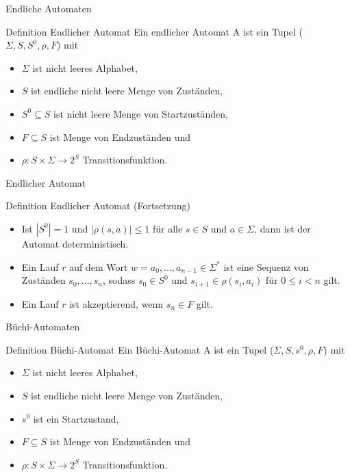 \begin{frame}{Endliche Automaten}
\begin{block}{Definition Endlicher Automat}
Ein endlicher Automat A ist ein Tupel ($\Sigma, S, S^0, \rho, F$) mit
\begin{itemize}
\setlength\itemsep{1em}
\item $\Sigma$ ist nicht leeres Alphabet,
\item $S$ ist endliche nicht leere Menge von Zuständen,
\item $S^0\subseteq S$ ist nicht leere Menge von Startzuständen,
\item $F\subseteq S$ ist Menge von Endzuständen und
\item $\rho : S \times \Sigma \rightarrow 2^S$ Transitionsfunktion.
\end{itemize}
\end{block}
\end{frame}

\begin{frame}{Endlicher Automat}
\begin{block}{Definition Endlicher Automat (Fortsetzung)}
\begin{itemize}
\item Ist $|S^0|=1$ und $|\rho(s,a)|\leq 1$ für alle $s\in S$ und $a\in \Sigma$, dann ist der Automat deterministisch.
\item Ein Lauf $r$ auf dem Wort $w=a_0,...,a_{n-1}\in \Sigma^\ast$ ist eine Sequenz von Zuständen $s_0,...,s_n$, sodass $s_0\in S^0$ und $s_{i+1}\in \rho(s_i,a_i)$ für $0\leq i < n$ gilt.
\item Ein Lauf $r$ ist akzeptierend, wenn $s_n\in F$ gilt.
\end{itemize}
\end{block}
\end{frame}

\begin{frame}{Büchi-Automaten}
\begin{block}{Definition Büchi-Automat}
Ein Büchi-Automat A ist ein Tupel ($\Sigma, S, s^0, \rho, F$) mit
\begin{itemize}
\item $\Sigma$ ist nicht leeres Alphabet,
\item $S$ ist endliche nicht leere Menge von Zuständen,
\item $s^0$ ist ein Startzustand,
\item $F\subseteq S$ ist Menge von Endzuständen und
\item $\rho : S \times \Sigma \rightarrow 2^S$ Transitionsfunktion.
\end{itemize}
\end{block}
\end{frame}

